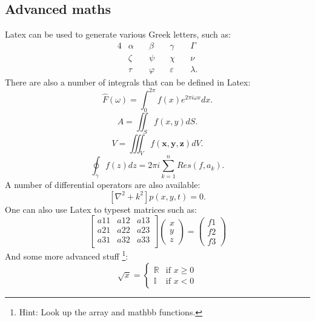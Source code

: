 \documentclass[a4paper,12pt]{article}
\begin{document}
\subsection{Advanced maths}
Latex can be used to generate various Greek letters, such as:
\begin{alignat*}{4}
  &\alpha \quad& \beta \quad & \gamma \quad & \Gamma \\  
  &\zeta \quad &\psi  \quad & \chi \quad & \nu \\
  &\tau \quad & \varphi \quad & \varepsilon \quad & \lambda.
\end{alignat*}
There are also a number of integrals that can be defined in Latex:
\begin{equation}
  \hat{F}(\omega)=\int_{0}^{2 \pi}f(x)e^{2\pi i \omega x}dx.
  \label{eqn:eq3}
\end{equation}
\begin{equation}
  A=\iint_{S} f(x,y) dS.
  \label{eqn:eq4}
\end{equation}
\begin{equation}
  V=\iiint_{V} f(\mathbf{x},\mathbf{y},\mathbf{z}) dV.
  \label{eqn:eq5}
\end{equation}
\begin{equation}
  \oint_{\gamma} f(z)dz=2\pi i\sum_{k=1}^{n} Res(f,a_{k}).
  \label{eqn:eq6}
\end{equation}
A number of differential operators are also available:
\begin{equation}
  \left[ \nabla^{2}+k^{2} \right]p(x,y,t)=0.
  \label{eqn:eq7}
\end{equation}
One can also use Latex to typeset matrices such as:
\begin{equation}
  \begin{bmatrix}
    a11 & a12 & a13\\
    a21 & a22 & a23\\
    a31 & a32 & a33\\
  \end{bmatrix}
  \begin{pmatrix}
    x \\
    y \\
    z 
  \end{pmatrix}
  =
  \begin{pmatrix}
    f1 \\
    f2 \\
    f3
  \end{pmatrix}
  \label{eqn:eq8}
\end{equation}
And some more advanced stuff \footnote{Hint: Look up the array and mathbb functions.}:
\begin{equation} 
  \sqrt{x} =
\left\{
	\begin{array}{ll}
	  \mathbb{R} & \mbox{if } x \geq 0 \\
	  \mathbb{I} & \mbox{if } x < 0
	\end{array}
\right.
  \label{eqn:multipart}
\end{equation}
\end{document}
